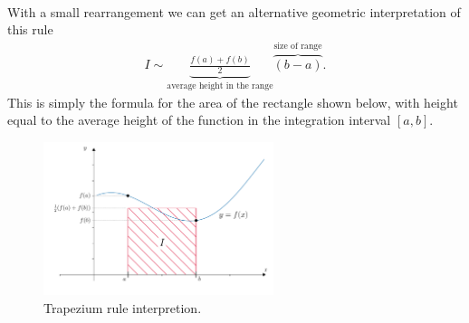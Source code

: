 \noindent {} \\

\noindent With a small rearrangement we can get an alternative geometric interpretation of this rule
\begin{align*}
I \sim \underbrace{\frac{f(a) + f(b)}{2}}_\text{average height in the range} \overbrace{\left(b-a \right)}^\text{size of range}.
\end{align*}
This is simply the formula for the area of the rectangle shown below, with height equal to the average height of the function in the integration interval $[a,b]$.

\begin{figure}[H]
	\begin{center}
	\includegraphics[width=0.6\textwidth]{figures/ch5_trapezium_alternative.pdf} 
	  \caption{Trapezium rule interpretion.} \label{fig:ch5_trapezium_alternative}
	\end{center}
\end{figure}


